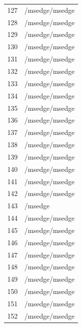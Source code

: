 \documentclass[a4paper,twoside,12pt]{book}
\begin{document}
\begin{appendices}
\begin{table}
\begin{tabular}{ll}
		127 &                                     /msedge/msedge \\
		128 &                                     /msedge/msedge \\
		129 &                                     /msedge/msedge \\
		130 &                                     /msedge/msedge \\
		131 &                                     /msedge/msedge \\
		132 &                                     /msedge/msedge \\
		133 &                                     /msedge/msedge \\
		134 &                                     /msedge/msedge \\
		135 &                                     /msedge/msedge \\
		136 &                                     /msedge/msedge \\
		137 &                                     /msedge/msedge \\
		138 &                                     /msedge/msedge \\
		139 &                                     /msedge/msedge \\
		140 &                                     /msedge/msedge \\
		141 &                                     /msedge/msedge \\
		142 &                                     /msedge/msedge \\
		143 &                                            /msedge \\
		144 &                                     /msedge/msedge \\
		145 &                                     /msedge/msedge \\
		146 &                                     /msedge/msedge \\
		147 &                                     /msedge/msedge \\
		148 &                                     /msedge/msedge \\
		149 &                                     /msedge/msedge \\
		150 &                                     /msedge/msedge \\
		151 &                                     /msedge/msedge \\
		152 &                                     /msedge/msedge \\

\end{tabular}
\end{table}
\end{appendices}
\end{document}
